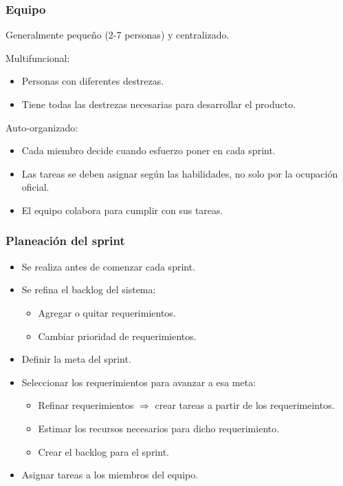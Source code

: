 \documentclass{beamer}
\begin{document}
\begin{frame}
    \frametitle{Equipo}
    \begin{itemize}
        \item{Generalmente peque\~no (2-7 personas) y centralizado.}
        \item{Multifuncional:
            \begin{itemize}
                \item{Personas con diferentes destrezas.}
                \item{Tiene todas las destrezas necesarias
                para desarrollar el producto.}
            \end{itemize}
        \item{Auto-organizado:
            \begin{itemize}
                \item{Cada miembro decide cuando esfuerzo poner en cada sprint.}
                \item{Las tareas se deben asignar seg\'un las habilidades,
                    no solo por la ocupaci\'on oficial.}
                \item{El equipo colabora para cumplir con sus tareas.}
            \end{itemize}
        }
        }
    \end{itemize}
\end{frame}

\begin{frame}
    \frametitle{Planeaci\'on del sprint}
    \begin{itemize}
        \item{Se realiza antes de comenzar cada sprint.}
        \item{Se refina el backlog del sistema:
            \begin{itemize}
                \item{Agregar o quitar requerimientos.}
                \item{Cambiar prioridad de requerimientos.}
            \end{itemize}
        }
        \item{Definir la meta del sprint.}
        \item{Seleccionar los requerimientos para avanzar a esa meta:
            \begin{itemize}
                \item{Refinar requerimientos $\Rightarrow$ crear tareas a partir de los requerimeintos.}
                \item{Estimar los recursos necesarios para dicho requerimiento.}
                \item{Crear el backlog para el sprint.}
            \end{itemize}
        }
        \item{Asignar tareas a los miembros del equipo.}
    \end{itemize}
\end{frame}
\end{document}
